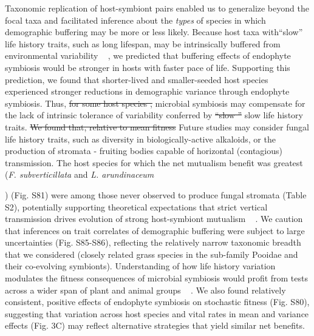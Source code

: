 \documentclass[lineno,sn-nature]{sn-jnl}%
\providecommand{\DIFadd}[1]{{\protect\color{blue}#1}} %
\providecommand{\DIFdel}[1]{{\protect\color{red}\protect\scriptsize\sout{#1}}}
\providecommand{\DIFadd}[1]{{\protect\color{blue}\uwave{#1}}} %
\providecommand{\DIFdel}[1]{{\protect\color{red}\sout{#1}}}                      %
\providecommand{\DIFaddbegin}{} %
\providecommand{\DIFaddend}{} %
\providecommand{\DIFdelbegin}{} %
\providecommand{\DIFdelend}{} %
\newcommand{\DIFscaledelfig}{0.5}
\newlength{\DIFdelgraphicswidth} %
\newlength{\DIFdelgraphicsheight} %
\newcommand{\DIFaddincludegraphics}[2][]{{\color{blue}\fbox{\DIFOincludegraphics[#1]{#2}}}} %
\newcommand{\DIFdelincludegraphics}[2][]{%
\sbox{\DIFdelgraphicsbox}{\DIFOincludegraphics[#1]{#2}}%
\settoboxwidth{\DIFdelgraphicswidth}{\DIFdelgraphicsbox} %
\settoboxtotalheight{\DIFdelgraphicsheight}{\DIFdelgraphicsbox} %
\scalebox{\DIFscaledelfig}{%
\parbox[b]{\DIFdelgraphicswidth}{\usebox{\DIFdelgraphicsbox}\\[-\baselineskip] \rule{\DIFdelgraphicswidth}{0em}}\llap{\resizebox{\DIFdelgraphicswidth}{\DIFdelgraphicsheight}{%
\setlength{\unitlength}{\DIFdelgraphicswidth}%
\begin{picture}(1,1)%
\thicklines\linethickness{2pt} %
{\color[rgb]{1,0,0}\put(0,0){\framebox(1,1){}}}%
{\color[rgb]{1,0,0}\put(0,0){\line( 1,1){1}}}%
{\color[rgb]{1,0,0}\put(0,1){\line(1,-1){1}}}%
\end{picture}%
}\hspace*{3pt}}} %
} %
\DeclareRobustCommand{\DIFaddbegin}{\DIFOaddbegin \let\includegraphics\DIFaddincludegraphics} %
\DeclareRobustCommand{\DIFaddend}{\DIFOaddend \let\includegraphics\DIFOincludegraphics} %
\DeclareRobustCommand{\DIFdelbegin}{\DIFOdelbegin \let\includegraphics\DIFdelincludegraphics} %
\DeclareRobustCommand{\DIFdelend}{\DIFOaddend \let\includegraphics\DIFOincludegraphics} %
\begin{document}
\DIFadd{Taxonomic replication of host-symbiont pairs enabled us to generalize beyond the focal taxa and facilitated inference about the }\emph{\DIFadd{types}} \DIFadd{of species in which demographic buffering may be more or less likely. 
Because host taxa with``slow'' life history traits, such as long lifespan, may be intrinsically buffered from environmental variability \mbox{%
\cite{rees1996evolutionary,moles2004seedling,morris2008longevity}}\hspace{0pt}%
, we predicted that buffering effects of endophyte symbiosis would be stronger in hosts with faster pace of life. 
Supporting this prediction, we found that shorter-lived and smaller-seeded host species experienced stronger reductions in demographic variance through endophyte symbiosis. 
Thus}\DIFaddend , \DIFdelbegin \DIFdel{for some host species , }\DIFdelend microbial symbiosis may compensate for the lack of intrinsic tolerance of variability conferred by \DIFdelbegin \DIFdel{``slow '' }\DIFdelend \DIFaddbegin \DIFadd{slow }\DIFaddend life history traits.
\DIFdelbegin \DIFdel{We found that, relative to mean fitness }\DIFdelend \DIFaddbegin \DIFadd{Future studies may consider fungal life history traits, such as diversity in biologically-active alkaloids, or the production of stromata - fruiting bodies capable of horizontal (contagious) transmission. 
The host species for which the net mutualism benefit was greatest (}\emph{\DIFadd{F. subverticillata}} \DIFadd{and }\emph{\DIFadd{L. arundinaceum}}\DIFadd{) (Fig. S81) were among those never observed to produce fungal stromata (Table S2), potentially supporting theoretical expectations that strict vertical transmission drives evolution of strong host-symbiont mutualism \mbox{%
\cite{fine1975vectors,afkhami2008symbiosis}}\hspace{0pt}%
. 
We caution that inferences on trait correlates of demographic buffering were subject to large uncertainties (Fig. S85-S86), reflecting the relatively narrow taxonomic breadth that we considered (closely related grass species in the sub-family Pooidae and their co-evolving symbionts).
Understanding of how life history variation modulates the fitness consequences of microbial symbiosis would profit from tests across a wider span of plant and animal groups \mbox{%
\cite{jeschke2009roles}}\hspace{0pt}%
. 
We also found relatively consistent, positive effects of endophyte symbiosis on stochastic fitness (Fig. S80), suggesting that variation across host species and vital rates in mean and variance effects (Fig. 3C) may reflect alternative strategies that yield similar net benefits. 

}
\end{document}
